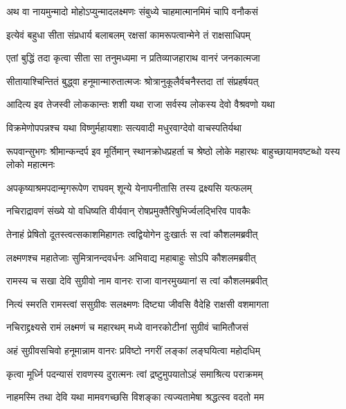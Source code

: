 \twolineshloka
{अथ वा नायमुन्मादो मोहोऽप्युन्मादलक्ष्मणः}
{संबुध्ये चाहमात्मानमिमं चापि वनौकसं} %

\twolineshloka
{इत्येवं बहुधा सीता संप्रधार्य बलाबलम्}
{रक्षसां कामरूपत्वान्मेने तं राक्षसाधिपम्} %

\twolineshloka
{एतां बुद्धिं तदा कृत्वा सीता सा तनुमध्यमा}
{न प्रतिव्याजहाराथ वानरं जनकात्मजा} %

\twolineshloka
{सीतायाश्चिन्तितं बुद्ध्वा हनूमान्मारुतात्मजः}
{श्रोत्रानुकूलैर्वचनैस्तदा तां संप्रहर्षयत्} %

\twolineshloka
{आदित्य इव तेजस्वी लोककान्तः शशी यथा}
{राजा सर्वस्य लोकस्य देवो वैश्रवणो यथा} %

\twolineshloka
{विक्रमेणोपपन्नश्च यथा विष्णुर्महायशाः}
{सत्यवादी मधुरवाग्देवो वाचस्पतिर्यथा} %

\threelineshloka
{रूपवान्सुभगः श्रीमान्कन्दर्प इव मूर्तिमान्}
{स्थानक्रोधप्रहर्ता च श्रेष्ठो लोके महारथः}
{बाहुच्छायामवष्टब्धो यस्य लोको महात्मनः} %

\twolineshloka
{अपकृष्याश्रमपदान्मृगरूपेण राघवम्}
{शून्ये येनापनीतासि तस्य द्रक्ष्यसि यत्फलम्} %

\twolineshloka
{नचिराद्रावणं संख्ये यो वधिष्यति वीर्यवान्}
{रोषप्रमुक्तैरिषुभिर्ज्वलद्भिरिव पावकैः} %

\twolineshloka
{तेनाहं प्रेषितो दूतस्त्वत्सकाशमिहागतः}
{त्वद्वियोगेन दुःखार्तः स त्वां कौशलमब्रवीत्} %

\twolineshloka
{लक्ष्मणश्च महातेजाः सुमित्रानन्दवर्धनः}
{अभिवाद्य महाबाहुः सोऽपि कौशलमब्रवीत्} %

\twolineshloka
{रामस्य च सखा देवि सुग्रीवो नाम वानरः}
{राजा वानरमुख्यानां स त्वां कौशलमब्रवीत्} %

\twolineshloka
{नित्यं स्मरति रामस्त्वां ससुग्रीवः सलक्ष्मणः}
{दिष्ट्या जीवसि वैदेहि राक्षसी वशमागता} %

\twolineshloka
{नचिराद्द्रक्ष्यसे रामं लक्ष्मणं च महारथम्}
{मध्ये वानरकोटीनां सुग्रीवं चामितौजसं} %

\twolineshloka
{अहं सुग्रीवसचिवो हनूमान्नाम वानरः}
{प्रविष्टो नगरीं लङ्कां लङ्घयित्वा महोदधिम्} %

\twolineshloka
{कृत्वा मूर्ध्नि पदन्यासं रावणस्य दुरात्मनः}
{त्वां द्रष्टुमुपयातोऽहं समाश्रित्य पराक्रमम्} %

\twolineshloka
{नाहमस्मि तथा देवि यथा मामवगच्छसि}
{विशङ्का त्यज्यतामेषा श्रद्धत्स्व वदतो मम} %


